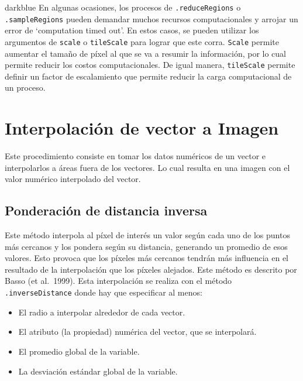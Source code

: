 \documentclass[
  12pt,
  letterpaper,
  twoside]{book}
\providecommand{\tightlist}{%
  \setlength{\itemsep}{0pt}\setlength{\parskip}{0pt}}
\begin{document}
\begin{bluebox2}

\begin{awesomeblock}{5pt}{\faLightbulb}{darkblue}
En algunas ocasiones, los procesos de \texttt{.reduceRegions} o \texttt{.sampleRegions} pueden demandar muchos recursos computacionales y arrojar un error de `computation timed out'. En estos casos, se pueden utilizar los argumentos de \texttt{scale} o \texttt{tileScale} para lograr que este corra. \texttt{Scale} permite aumentar el tamaño de píxel al que se va a resumir la información, por lo cual permite reducir los costos computacionales. De igual manera, \texttt{tileScale} permite definir un factor de escalamiento que permite reducir la carga computacional de un proceso.

\end{awesomeblock}

\end{bluebox2}

\hypertarget{interpolaciuxf3n-de-vector-a-imagen}{%
\section{Interpolación de vector a Imagen}\label{interpolaciuxf3n-de-vector-a-imagen}}

Este procedimiento consiste en tomar los datos numéricos de un vector e interpolarlos a áreas fuera de los vectores. Lo cual resulta en una imagen con el valor numérico interpolado del vector.

\hypertarget{ponderaciuxf3n-de-distancia-inversa}{%
\subsection{Ponderación de distancia inversa}\label{ponderaciuxf3n-de-distancia-inversa}}

Este método interpola al píxel de interés un valor según cada uno de los puntos más cercanos y los pondera según su distancia, generando un promedio de esos valores. Esto provoca que los píxeles más cercanos tendrán más influencia en el resultado de la interpolación que los píxeles alejados. Este método es descrito por Basso (et al.~1999). Esta interpolación se realiza con el método \texttt{.inverseDistance} donde hay que especificar al menos:

\begin{itemize}
\tightlist
\item
  El radio a interpolar alrededor de cada vector.
\item
  El atributo (la propiedad) numérica del vector, que se interpolará.
\item
  El promedio global de la variable.
\item
  La desviación estándar global de la variable.
\end{itemize}
\end{document}
